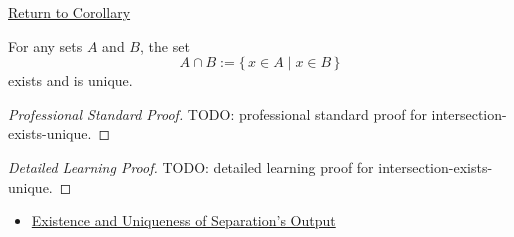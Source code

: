 \newpage
{}
\label{prf:intersection-exists-unique}

\begin{remark*}[Return]
\hyperref[cor:intersection-exists-unique]{Return to Corollary}
\end{remark*}

\begin{corollary*}
For any sets $A$ and $B$, the set
\[
  A\cap B:=\{\,x\in A\mid x\in B\,\}
\]
exists and is unique.
\end{corollary*}

\begin{proof}[Professional Standard Proof]
\LRAProofBodyStart
TODO: professional standard proof for intersection-exists-unique.
\end{proof}

\begin{proof}[Detailed Learning Proof]
\LRAProofBodyStart
TODO: detailed learning proof for intersection-exists-unique.
\end{proof}

\begin{remark*}
\end{remark*}

\begin{dependencies}
\begin{itemize}
  \item \hyperref[thm:separation-output-exists-unique]{Existence and Uniqueness of Separation's Output}
\end{itemize}
\end{dependencies}

\clearpage
